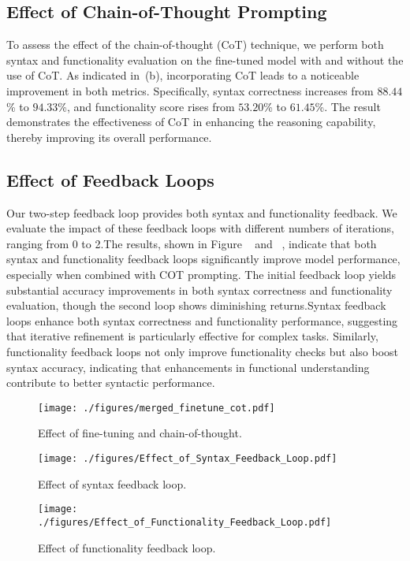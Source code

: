 \subsection{Effect of Chain-of-Thought Prompting}\label{subsec:exp_cot}
To assess the effect of the chain-of-thought (CoT) technique,
we perform both syntax and functionality evaluation on the fine-tuned model with and without the use of CoT.
As indicated in~(b), incorporating CoT leads to a noticeable improvement in both metrics. 
Specifically, syntax correctness increases from $88.44$\% to $94.33$\%, and functionality score rises from $53.20$\% to $61.45$\%. 
The result demonstrates the effectiveness of CoT in enhancing the reasoning capability, thereby improving its overall performance.


\subsection{Effect of Feedback Loops}\label{subsec:exp_feedback}
Our two-step feedback loop provides both syntax and functionality feedback. We evaluate the impact of these feedback loops with different numbers of iterations, ranging from 0 to 2.The results, shown in Figure ~ and ~, indicate that both syntax and functionality feedback loops significantly improve model performance, especially when combined with COT prompting. The initial feedback loop yields substantial accuracy improvements in both syntax correctness and functionality evaluation, though the second loop shows diminishing returns.Syntax feedback loops enhance both syntax correctness and functionality performance, suggesting that iterative refinement is particularly effective for complex tasks. Similarly, functionality feedback loops not only improve functionality checks but also boost syntax accuracy, indicating that enhancements in functional understanding contribute to better syntactic performance.

 \begin{figure}[t]
    \centering
    \texttt{[image: ./figures/merged\_finetune\_cot.pdf]}
    \vspace{-5mm}
    \caption{Effect of fine-tuning and chain-of-thought.}
    \label{fig:finetune_cot}
\end{figure}

\begin{figure}[t]
    \centering
    \texttt{[image: ./figures/Effect\_of\_Syntax\_Feedback\_Loop.pdf]}
    \vspace{-2mm}
    \caption{Effect of syntax feedback loop.}
    \vspace{-2mm}
    \label{fig:syntax_feedback}
\end{figure}
\begin{figure}[t]
    \centering
    \texttt{[image: ./figures/Effect\_of\_Functionality\_Feedback\_Loop.pdf]}
    \caption{Effect of functionality feedback loop.}
    \vspace{-2mm}
    \label{fig:func_feedback}
\end{figure}


